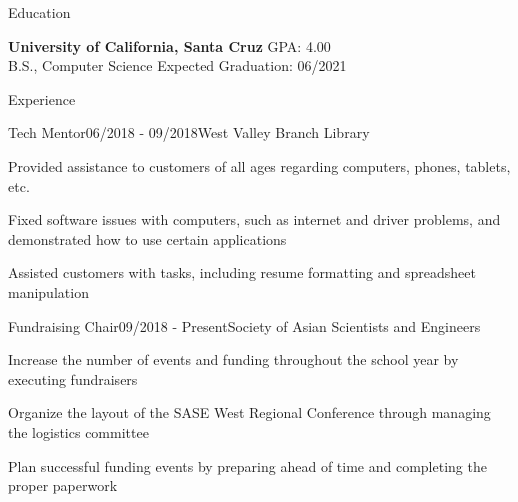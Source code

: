 \documentclass{resume}
\begin{document}
\begin{rSection}{Education}

{\bf University of California, Santa Cruz} \hfill {GPA: 4.00} 
\\ B.S., Computer Science \hfill {Expected Graduation: 06/2021}

\end{rSection}


\begin{rSection}{Experience}

\begin{rSubsection}{Tech Mentor}{06/2018 - 09/2018}{West Valley Branch Library}{}
\item Provided assistance to customers of all ages regarding computers, phones, tablets, etc.
\item Fixed software issues with computers, such as internet and driver problems, and demonstrated how to use certain applications
\item Assisted customers with tasks, including resume formatting and spreadsheet manipulation
\end{rSubsection}

\begin{rSubsection}{Fundraising Chair}{09/2018 - Present}{Society of Asian Scientists and Engineers}{}
\item Increase the number of events and funding throughout the school year by executing fundraisers
\item Organize the layout of the SASE West Regional Conference through managing the logistics committee
\item Plan successful funding events by preparing ahead of time and completing the proper paperwork
\end{rSubsection}

\end{rSection}
\end{document}
